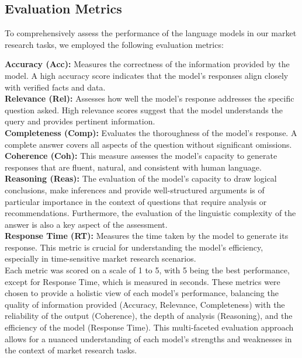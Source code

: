 \documentclass[12pt,a4paper]{article}
\begin{document}
	\subsection{Evaluation Metrics}
	To comprehensively assess the performance of the language models in our market research tasks, we employed the following evaluation metrics:
	
	\textbf{Accuracy (Acc):} Measures the correctness of the information provided by the model. A high accuracy score indicates that the model's responses align closely with verified facts and data.\\
	\textbf{Relevance (Rel):} Assesses how well the model's response addresses the specific question asked. High relevance scores suggest that the model understands the query and provides pertinent information.\\
	\textbf{Completeness (Comp):} Evaluates the thoroughness of the model's response. A complete answer covers all aspects of the question without significant omissions.
	\textbf{Coherence (Coh):} This measure assesses the model's capacity to generate responses that are fluent, natural, and consistent with human language.\\
	\textbf{Reasoning (Reas):} The evaluation of the model's capacity to draw logical conclusions, make inferences and provide well-structured arguments is of particular importance in the context of questions that require analysis or recommendations.
	Furthermore, the evaluation of the linguistic complexity of the answer is also a key aspect of the assessment.\\
	\textbf{Response Time (RT):} Measures the time taken by the model to generate its response. This metric is crucial for understanding the model's efficiency, especially in time-sensitive market research scenarios.\\
	
Each metric was scored on a scale of 1 to 5, with 5 being the best performance, except for Response Time, which is measured in seconds. 
These metrics were chosen to provide a holistic view of each model's performance, balancing the quality of information provided (Accuracy, Relevance, Completeness) with the reliability of the output (Coherence), the depth of analysis (Reasoning), and the efficiency of the model (Response Time). This multi-faceted evaluation approach allows for a nuanced understanding of each model's strengths and weaknesses in the context of market research tasks.
	
\end{document}
